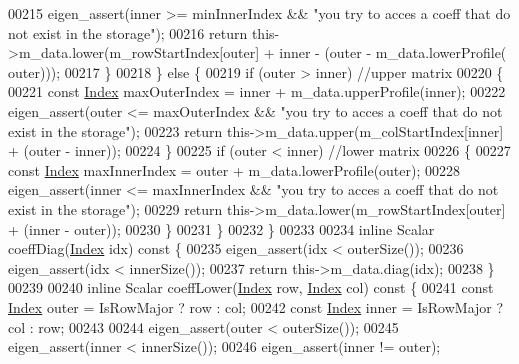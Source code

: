 \begin{DoxyCode}
00215                 eigen\_assert(inner >= minInnerIndex && \textcolor{stringliteral}{"you try to acces a coeff that do not exist in the
       storage"});
00216                 \textcolor{keywordflow}{return} this->m\_data.lower(m\_rowStartIndex[outer] + inner - (outer - m\_data.lowerProfile(
      outer)));
00217             \}
00218         \} \textcolor{keywordflow}{else} \{
00219             \textcolor{keywordflow}{if} (outer > inner) \textcolor{comment}{//upper matrix}
00220             \{
00221                 \textcolor{keyword}{const} \hyperlink{namespace_eigen_a62e77e0933482dafde8fe197d9a2cfde}{Index} maxOuterIndex = inner + m\_data.upperProfile(inner);
00222                 eigen\_assert(outer <= maxOuterIndex && \textcolor{stringliteral}{"you try to acces a coeff that do not exist in the
       storage"});
00223                 \textcolor{keywordflow}{return} this->m\_data.upper(m\_colStartIndex[inner] + (outer - inner));
00224             \}
00225             \textcolor{keywordflow}{if} (outer < inner) \textcolor{comment}{//lower matrix}
00226             \{
00227                 \textcolor{keyword}{const} \hyperlink{namespace_eigen_a62e77e0933482dafde8fe197d9a2cfde}{Index} maxInnerIndex = outer + m\_data.lowerProfile(outer);
00228                 eigen\_assert(inner <= maxInnerIndex && \textcolor{stringliteral}{"you try to acces a coeff that do not exist in the
       storage"});
00229                 \textcolor{keywordflow}{return} this->m\_data.lower(m\_rowStartIndex[outer] + (inner - outer));
00230             \}
00231         \}
00232     \}
00233 
00234     \textcolor{keyword}{inline} Scalar coeffDiag(\hyperlink{namespace_eigen_a62e77e0933482dafde8fe197d9a2cfde}{Index} idx)\textcolor{keyword}{ const }\{
00235         eigen\_assert(idx < outerSize());
00236         eigen\_assert(idx < innerSize());
00237         \textcolor{keywordflow}{return} this->m\_data.diag(idx);
00238     \}
00239 
00240     \textcolor{keyword}{inline} Scalar coeffLower(\hyperlink{namespace_eigen_a62e77e0933482dafde8fe197d9a2cfde}{Index} row, \hyperlink{namespace_eigen_a62e77e0933482dafde8fe197d9a2cfde}{Index} col)\textcolor{keyword}{ const }\{
00241         \textcolor{keyword}{const} \hyperlink{namespace_eigen_a62e77e0933482dafde8fe197d9a2cfde}{Index} outer = IsRowMajor ? row : col;
00242         \textcolor{keyword}{const} \hyperlink{namespace_eigen_a62e77e0933482dafde8fe197d9a2cfde}{Index} inner = IsRowMajor ? col : row;
00243 
00244         eigen\_assert(outer < outerSize());
00245         eigen\_assert(inner < innerSize());
00246         eigen\_assert(inner != outer);

\end{DoxyCode}
